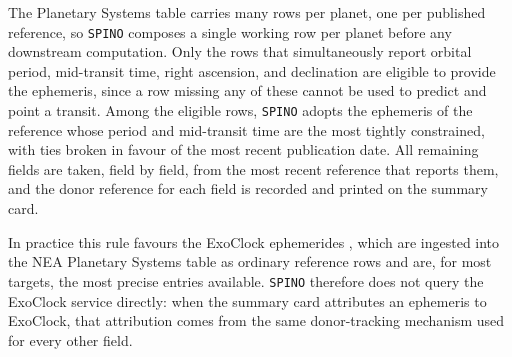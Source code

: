 


The Planetary Systems table carries many rows per planet, one per published reference, so \texttt{SPINO} composes a single working row per planet before any downstream computation. Only the rows that simultaneously report orbital period, mid-transit time, right ascension, and declination are eligible to provide the ephemeris, since a row missing any of these cannot be used to predict and point a transit. Among the eligible rows, \texttt{SPINO} adopts the ephemeris of the reference whose period and mid-transit time are the most tightly constrained, with ties broken in favour of the most recent publication date. All remaining fields are taken, field by field, from the most recent reference that reports them, and the donor reference for each field is recorded and printed on the summary card.

In practice this rule favours the ExoClock ephemerides \citep{kokori2023}, which are ingested into the NEA Planetary Systems table as ordinary reference rows and are, for most targets, the most precise entries available. \texttt{SPINO} therefore does not query the ExoClock service directly: when the summary card attributes an ephemeris to ExoClock, that attribution comes from the same donor-tracking mechanism used for every other field.



